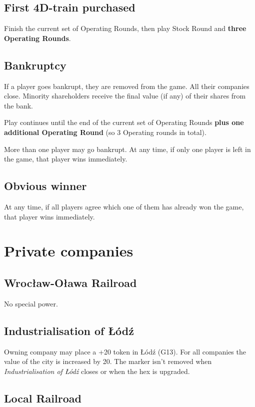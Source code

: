 \documentclass[10pt,a4paper,twocolumn]{article}
\begin{document}
\subsection{First 4D-train purchased}
Finish the current set of Operating Rounds, then play Stock Round and \textbf{three Operating Rounds}.

\subsection{Bankruptcy}
If a player goes bankrupt, they are removed from the game. All their companies close. Minority shareholders receive the final value (if any) of their shares from the bank.

Play continues until the end of the current set of Operating Rounds \textbf{plus one additional Operating Round} (so 3 Operating rounds in total). 

More than one player may go bankrupt. At any time, if only one player is left in the game, that player wins immediately.

\subsection{Obvious winner}
At any time, if all players agree which one of them has already won the game, that player wins immediately.

\section{Private companies}

\subsection{Wrocław-Oława Railroad}

No special power.

\subsection{Industrialisation of Łódź}

Owning company may place a +20 token in Łódź (G13). For all companies the value of the city is increased by 20. The marker isn't removed when \textit{Industrialisation of Łódź} closes or when the hex is upgraded.

\subsection{Local Railroad}
\end{document}
